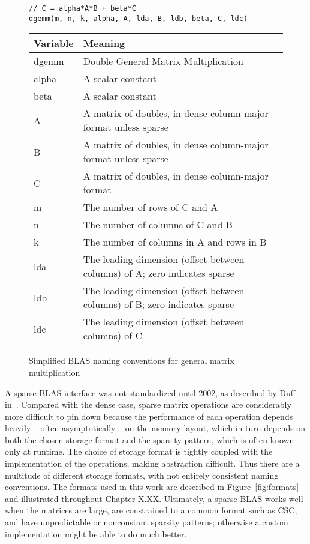 \begin{figure}
\begin{verbatim}
// C = alpha*A*B + beta*C
dgemm(m, n, k, alpha, A, lda, B, ldb, beta, C, ldc)
\end{verbatim}

\begin{tabular}{ll}
	\toprule
	Variable    &  Meaning \\
	\midrule
	dgemm & Double General Matrix Multiplication \\
	alpha & A scalar constant \\
	beta  & A scalar constant \\
	A     & A matrix of doubles, in dense column-major format unless sparse \\
	B     & A matrix of doubles, in dense column-major format unless sparse \\
	C     & A matrix of doubles, in dense column-major format \\
	m     & The number of rows of C and A \\
	n     & The number of columns of C and B \\
	k     & The number of columns in A and rows in B \\
	lda   & The leading dimension (offset between columns) of A; zero indicates sparse \\
	ldb   & The leading dimension (offset between columns) of B; zero indicates sparse \\
	ldc   & The leading dimension (offset between columns) of C \\


	\bottomrule
\end{tabular}
\caption{Simplified BLAS naming conventions for general matrix multiplication}
\label{fig:blas}
\end{figure}


A sparse BLAS interface was not standardized until 2002, as described by Duff in~\cite{Duff:2002:OSB:567806.567810}. Compared with the dense case, sparse matrix operations are considerably more difficult to pin down because the performance of each operation depends heavily -- often asymptotically -- on the memory layout, which in turn depends on both the chosen storage format and the sparsity pattern, which is often known only at runtime. The choice of storage format is tightly coupled with the implementation of the operations, making abstraction difficult. Thus there are a multitude of different storage formats, with not entirely consistent naming conventions. The formats used in this work are described in Figure~\ref{fig:formats} and illustrated throughout Chapter X.XX. Ultimately, a sparse BLAS works well when the matrices are large, are constrained to a common format such as CSC, and have unpredictable or nonconstant sparsity patterns; otherwise a custom implementation might be able to do much better.

